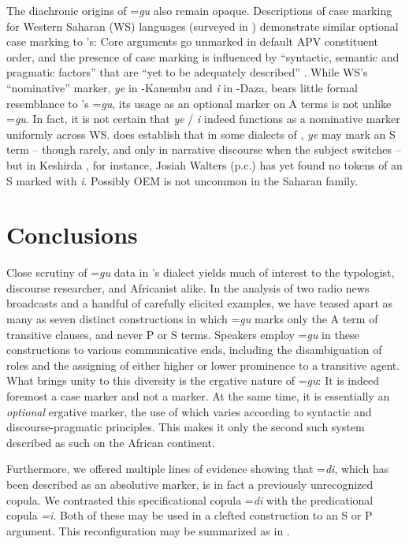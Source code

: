 \documentclass[output=paper,modfonts]{langscibook}
\begin{document}
The diachronic origins of =\textit{gu} also remain opaque. Descriptions of case marking for Western Saharan (WS) languages (surveyed in \citealt[38--57]{König2008}) demonstrate similar optional case marking to ’s: Core arguments go unmarked in default APV constituent order, and the presence of case marking is influenced by “syntactic, semantic and pragmatic factors” that are “yet to be adequately described” \citep[193]{Hutchison1986}.  While WS’s “nominative” marker, \textit{ye} in -Kanembu and \textit{i} in -Daza, bears little formal resemblance to ’s =\textit{gu}, its usage as an optional marker on A terms is not unlike =\textit{gu}. In fact, it is not certain that \textit{ye} / \textit{i} indeed functions as a nominative marker uniformly across WS. \citet[203--205]{Hutchison1986} does establish that in some dialects of , \textit{ye} may mark an S term – though rarely, and only in narrative discourse when the subject switches – but in Keshirda , for instance, Josiah Walters (p.c.) has yet found no tokens of an S marked with \textit{i}. Possibly OEM is not uncommon in the Saharan family.

\section{Conclusions}\label{sec:wolfe:6}
Close scrutiny of =\textit{gu} data in ’s  dialect yields much of interest to the typologist, discourse researcher, and Africanist alike. In the analysis of two radio news broadcasts and a handful of carefully elicited examples, we have teased apart as many as seven distinct constructions in which =\textit{gu} marks only the A term of transitive clauses, and never P or S terms. Speakers employ =\textit{gu} in these constructions to various communicative ends, including the disambiguation of roles and the assigning of either higher or lower prominence to a transitive agent. What brings unity to this diversity is the ergative nature of =\textit{gu}: It is indeed foremost a case marker and not a  marker. At the same time, it is essentially an \textit{optional} ergative marker, the use of which varies according to syntactic and discourse-pragmatic principles. This makes it only the second such system described as such on the African continent.

Furthermore, we offered multiple lines of evidence showing that =\textit{di}, which has been described as an absolutive  marker, is in fact a previously unrecognized copula. We contrasted this specificational copula =\textit{di} with the predicational copula \textit{=i}. Both of these may be used in a clefted construction to  an S or P argument. This reconfiguration may be summarized as in .
\end{document}
